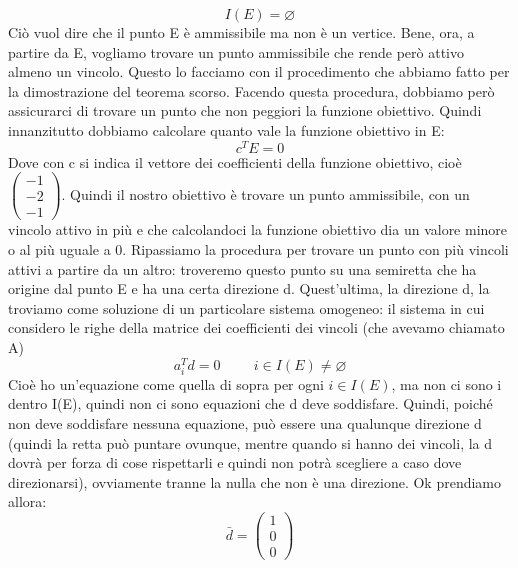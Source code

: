 \begin{equation*}
    I(E) = \varnothing
\end{equation*}
Ciò vuol dire che il punto E è ammissibile ma non è un vertice. Bene, ora, a partire da E, vogliamo trovare un punto ammissibile che rende però attivo almeno un vincolo. Questo lo facciamo con il procedimento che abbiamo fatto per la dimostrazione del teorema scorso. Facendo questa procedura, dobbiamo però assicurarci di trovare un punto che non peggiori la funzione obiettivo. Quindi innanzitutto dobbiamo calcolare quanto vale la funzione obiettivo in E:
\begin{equation*}
    c^TE = 0
\end{equation*}
Dove con c si indica il vettore dei coefficienti della funzione obiettivo, cioè $\begin{pmatrix}
    -1\\
    -2\\
    -1
\end{pmatrix}$. Quindi il nostro obiettivo è trovare un punto ammissibile, con un vincolo attivo in più e che calcolandoci la funzione obiettivo dia un valore minore o al più uguale a 0. Ripassiamo la procedura per trovare un punto con più vincoli attivi a partire da un altro: troveremo questo punto su una semiretta che ha origine dal punto E e ha una certa direzione d. Quest'ultima, la direzione d, la troviamo come soluzione di un particolare sistema omogeneo: il sistema in cui considero le righe della matrice dei coefficienti dei vincoli (che avevamo chiamato A)
\begin{equation*}
    a_i^Td = 0 \hspace{1cm} i \in I(E) \neq \varnothing
\end{equation*}
Cioè ho un'equazione come quella di sopra per ogni $i \in I(E)$, ma non ci sono i dentro I(E), quindi non ci sono equazioni che d deve soddisfare. Quindi, poiché non deve soddisfare nessuna equazione, può essere una qualunque direzione d (quindi la retta può puntare ovunque, mentre quando si hanno dei vincoli, la d dovrà per forza di cose rispettarli e quindi non potrà scegliere a caso dove direzionarsi), ovviamente tranne la nulla che non è una direzione. Ok prendiamo allora:
\begin{equation*}
    \bar{d} = \begin{pmatrix}
        1\\
        0\\
        0
    \end{pmatrix}
\end{equation*}

